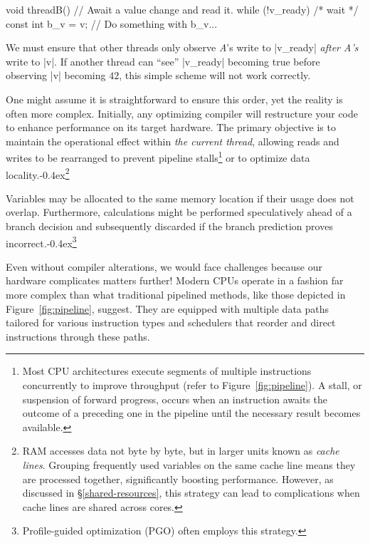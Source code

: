 \documentclass[fontsize=10pt, oneside]{scrartcl}
\newcommand{\punckern}{\kern-0.4ex}
\newcommand{\cplusplus}[1]{C\kern-0.1ex\raisebox{0.15ex}{\texttt{++}}}
\newcommand{\fig}[1]{Figure~\ref{#1}}
\newcommand{\introduce}[1]{\textit{#1}}
\newcommand{\secref}[1]{\hyperref[#1]{\textsc{\S}\ref*{#1}}}
\begin{document}
\begin{ccode}
void threadB()
{
    // Await a value change and read it.
    while (!v_ready) { /* wait */ }
    const int b_v = v;
    // Do something with b_v...
}
\end{ccode}
We must ensure that other threads only observe \textit{A}'s write to \cc|v_ready| \emph{after A's} write to \cc|v|.
If another thread can ``see'' \cc|v_ready| becoming true before observing \cc|v| becoming $42$,
this simple scheme will not work correctly.

One might assume it is straightforward to ensure this order,
yet the reality is often more complex.
Initially, any optimizing compiler will restructure your code to enhance performance on its target hardware.
The primary objective is to maintain the operational effect within \emph{the current thread},
allowing reads and writes to be rearranged to prevent pipeline stalls\footnote{%
Most \textsc{CPU} architectures execute segments of multiple instructions concurrently to improve throughput (refer to \fig{fig:pipeline}).
A stall, or suspension of forward progress, occurs when an instruction awaits the outcome of a preceding one in the pipeline until the necessary result becomes available.} or to optimize data locality.\punckern\footnote{%
\textsc{RAM} accesses data not byte by byte, but in larger units known as \introduce{cache lines}.
Grouping frequently used variables on the same cache line means they are processed together,
significantly boosting performance. However, as discussed in \secref{shared-resources},
this strategy can lead to complications when cache lines are shared across cores.}

Variables may be allocated to the same memory location if their usage does not overlap.
Furthermore, calculations might be performed speculatively ahead of a branch decision and subsequently discarded if the branch prediction proves incorrect.\punckern\footnote{%
Profile-guided optimization (PGO) often employs this strategy.}

Even without compiler alterations,
we would face challenges because our hardware complicates matters further!
Modern \textsc{CPU}s operate in a fashion far more complex than what traditional pipelined methods,
like those depicted in \fig{fig:pipeline}, suggest.
They are equipped with multiple data paths tailored for various instruction types and schedulers that reorder and direct instructions through these paths.
\end{document}
